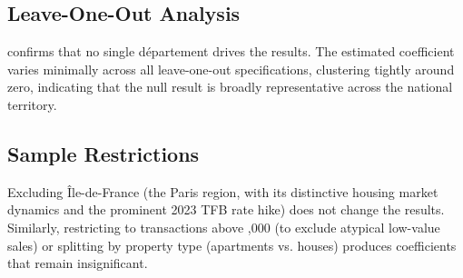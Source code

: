 \documentclass[12pt]{article}
\begin{document}
\subsection{Leave-One-Out Analysis}

 confirms that no single d\'epartement drives the results. The estimated coefficient varies minimally across all leave-one-out specifications, clustering tightly around zero, indicating that the null result is broadly representative across the national territory.

\subsection{Sample Restrictions}

Excluding \^Ile-de-France (the Paris region, with its distinctive housing market dynamics and the prominent 2023 TFB rate hike) does not change the results. Similarly, restricting to transactions above ,000 (to exclude atypical low-value sales) or splitting by property type (apartments vs. houses) produces coefficients that remain insignificant.
\end{document}
